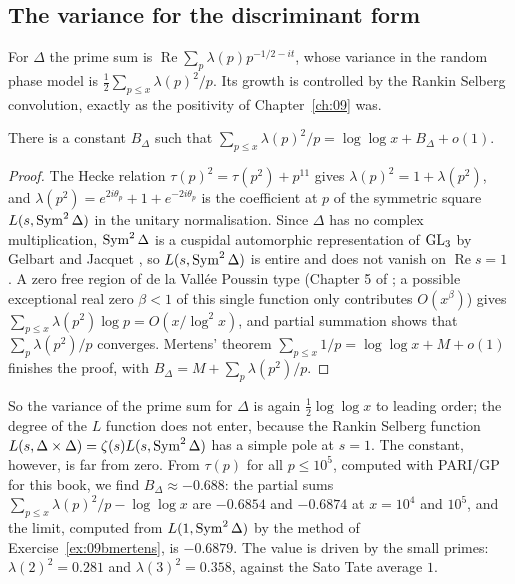 \subsection{The variance for the discriminant form}

For $\Delta$ the prime sum is $\operatorname{Re}\sum_p\lambda(p)p^{-1/2-it}$, whose variance in the random phase model is $\frac12\sum_{p\le x}\lambda(p)^2/p$. Its growth is controlled by the Rankin Selberg convolution, exactly as the positivity of Chapter~\ref{ch:09} was.

\begin{lemma}\label{lem:09brs}
There is a constant $B_\Delta$ such that $\sum_{p\le x}\lambda(p)^2/p=\log\log x+B_\Delta+o(1)$.
\end{lemma}

\begin{proof}
The Hecke relation $\tau(p)^2=\tau(p^2)+p^{11}$ gives $\lambda(p)^2=1+\lambda(p^2)$, and $\lambda(p^2)=e^{2i\theta_p}+1+e^{-2i\theta_p}$ is the coefficient at $p$ of the symmetric square $L(s,\operatorname{Sym}^2\Delta)$ in the unitary normalisation. Since $\Delta$ has no complex multiplication, $\operatorname{Sym}^2\Delta$ is a cuspidal automorphic representation of $\mathrm{GL}_3$ by Gelbart and Jacquet \cite{gelbartjacquet1978}, so $L(s,\operatorname{Sym}^2\Delta)$ is entire and does not vanish on $\operatorname{Re}s=1$ \cite{jacquetshalika1976}. A zero free region of de la Vall\'ee Poussin type (Chapter 5 of \cite{iwanieckowalski2004}; a possible exceptional real zero $\beta<1$ of this single function only contributes $O(x^\beta)$) gives $\sum_{p\le x}\lambda(p^2)\log p=O(x/\log^2x)$, and partial summation shows that $\sum_p\lambda(p^2)/p$ converges. Mertens' theorem $\sum_{p\le x}1/p=\log\log x+M+o(1)$ finishes the proof, with $B_\Delta=M+\sum_p\lambda(p^2)/p$.
\end{proof}

So the variance of the prime sum for $\Delta$ is again $\frac12\log\log x$ to leading order; the degree of the $L$ function does not enter, because the Rankin Selberg function $L(s,\Delta\times\Delta)=\zeta(s)L(s,\operatorname{Sym}^2\Delta)$ has a simple pole at $s=1$. The constant, however, is far from zero. From $\tau(p)$ for all $p\le10^5$, computed with PARI/GP for this book, we find $B_\Delta\approx-0.688$: the partial sums $\sum_{p\le x}\lambda(p)^2/p-\log\log x$ are $-0.6854$ and $-0.6874$ at $x=10^4$ and $10^5$, and the limit, computed from $L(1,\operatorname{Sym}^2\Delta)$ by the method of Exercise~\ref{ex:09bmertens}, is $-0.6879$. The value is driven by the small primes: $\lambda(2)^2=0.281$ and $\lambda(3)^2=0.358$, against the Sato Tate average $1$.

